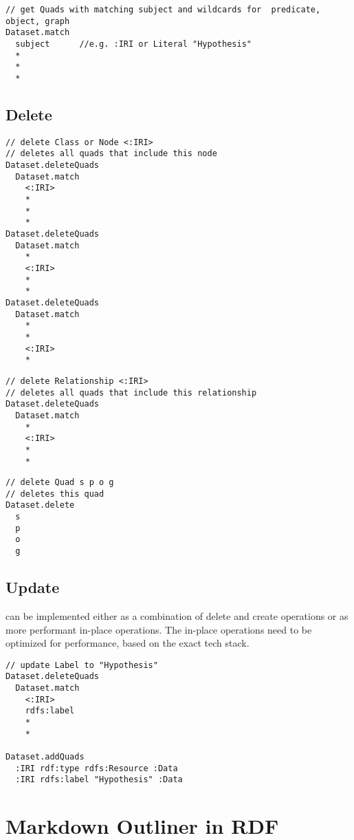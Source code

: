 \begin{lstlisting}
// get Quads with matching subject and wildcards for  predicate, object, graph
Dataset.match
  subject      //e.g. :IRI or Literal "Hypothesis"
  * 
  *
  *

\end{lstlisting}


\subsection*{Delete}  

\begin{lstlisting}
// delete Class or Node <:IRI>
// deletes all quads that include this node
Dataset.deleteQuads
  Dataset.match
    <:IRI> 
    * 
    * 
    *
Dataset.deleteQuads
  Dataset.match
    * 
    <:IRI> 
    * 
    *
Dataset.deleteQuads
  Dataset.match
    * 
    * 
    <:IRI> 
    *

\end{lstlisting}
\begin{lstlisting}
// delete Relationship <:IRI>
// deletes all quads that include this relationship
Dataset.deleteQuads
  Dataset.match
    * 
    <:IRI> 
    * 
    *

\end{lstlisting}

\begin{lstlisting}
// delete Quad s p o g
// deletes this quad
Dataset.delete
  s
  p
  o
  g

\end{lstlisting}

\subsection*{Update} 
can be implemented either as a combination of delete and create operations or as more performant in-place operations. The in-place operations need to be optimized for performance, based on the exact tech stack.

\begin{lstlisting}
// update Label to "Hypothesis"
Dataset.deleteQuads
  Dataset.match
    <:IRI> 
    rdfs:label 
    * 
    *

Dataset.addQuads
  :IRI rdf:type rdfs:Resource :Data
  :IRI rdfs:label "Hypothesis" :Data

\end{lstlisting}






\section{Markdown Outliner in RDF}

